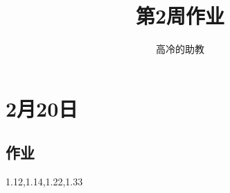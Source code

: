 \documentclass{article}
\title{第2周作业}
\author{高冷的助教}
\begin{document}
\maketitle
\section{2月20日}
\subsection*{作业}
1.12,1.14,1.22,1.33
\end{document}
